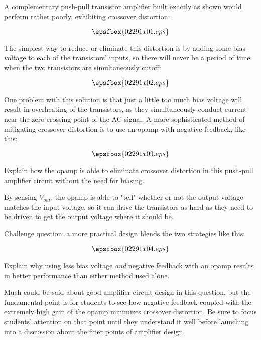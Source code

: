 

A complementary push-pull transistor amplifier built exactly as shown would perform rather poorly, exhibiting crossover distortion:

$$\epsfbox{02291x01.eps}$$

The simplest way to reduce or eliminate this distortion is by adding some bias voltage to each of the transistors' inputs, so there will never be a period of time when the two transistors are simultaneously cutoff:

$$\epsfbox{02291x02.eps}$$

One problem with this solution is that just a little too much bias voltage will result in overheating of the transistors, as they simultaneously conduct current near the zero-crossing point of the AC signal.  A more sophisticated method of mitigating crossover distortion is to use an opamp with negative feedback, like this:

$$\epsfbox{02291x03.eps}$$

Explain how the opamp is able to eliminate crossover distortion in this push-pull amplifier circuit without the need for biasing.







By sensing $V_{out}$, the opamp is able to "tell" whether or not the output voltage matches the input voltage, so it can drive the transistors as hard as they need to be driven to get the output voltage where it should be.

\vskip 10pt

Challenge question: a more practical design blends the two strategies like this:

$$\epsfbox{02291x04.eps}$$

Explain why using less bias voltage {\it and} negative feedback with an opamp results in better performance than either method used alone.







Much could be said about good amplifier circuit design in this question, but the fundamental point is for students to see how negative feedback coupled with the extremely high gain of the opamp minimizes crossover distortion.  Be sure to focus students' attention on that point until they understand it well before launching into a discussion about the finer points of amplifier design.

